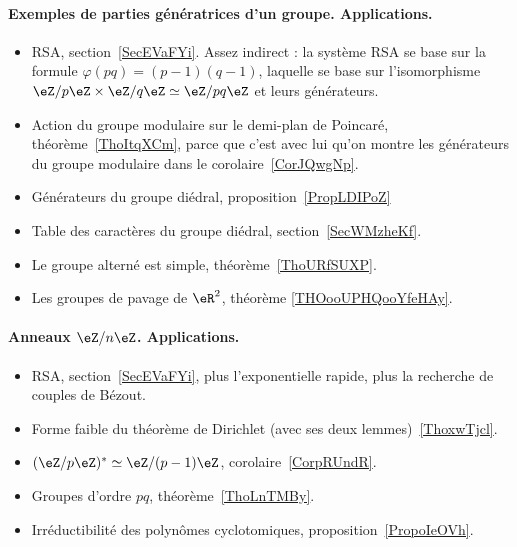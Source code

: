\paragraph{Exemples de parties génératrices d’un groupe. Applications.}
\begin{itemize}
    \item RSA, section~\ref{SecEVaFYi}. Assez indirect : la système RSA se base sur la formule \( \varphi(pq)=(p-1)(q-1)\), laquelle se base sur l'isomorphisme \( \eZ/p\eZ\times \eZ/q\eZ\simeq \eZ/pq\eZ\) et leurs générateurs.
    \item Action du groupe modulaire sur le demi-plan de Poincaré, théorème~\ref{ThoItqXCm}, parce que c'est avec lui qu'on montre les générateurs du groupe modulaire dans le corolaire~\ref{CorJQwgNp}.
    \item Générateurs du groupe diédral, proposition~\ref{PropLDIPoZ}
    \item Table des caractères du groupe diédral, section~\ref{SecWMzheKf}.
    \item Le groupe alterné est simple, théorème~\ref{ThoURfSUXP}.
    \item Les groupes de pavage de \( \eR^2\), théorème \ref{THOooUPHQooYfeHAy}.
\end{itemize}

\paragraph{Anneaux $\eZ/n\eZ$. Applications.}
\begin{itemize}
    \item RSA, section~\ref{SecEVaFYi}, plus l'exponentielle rapide, plus la recherche de couples de Bézout.
    \item Forme faible du théorème de Dirichlet (avec ses deux lemmes)~\ref{ThoxwTjcl}.
    \item \( (\eZ/p\eZ)^*\simeq \eZ/(p-1)\eZ\), corolaire~\ref{CorpRUndR}.
    \item Groupes d'ordre \( pq\), théorème~\ref{ThoLnTMBy}.
    \item Irréductibilité des polynômes cyclotomiques, proposition~\ref{PropoIeOVh}.
\end{itemize}

